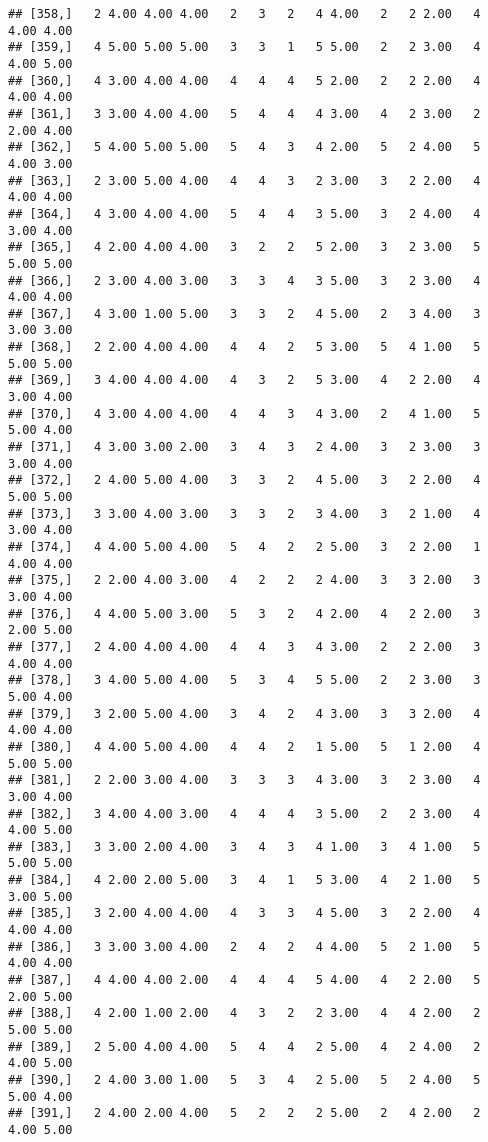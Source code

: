\documentclass[]{article}
\begin{document}
\begin{verbatim}
## [358,]   2 4.00 4.00 4.00   2   3   2   4 4.00   2   2 2.00   4 4.00 4.00
## [359,]   4 5.00 5.00 5.00   3   3   1   5 5.00   2   2 3.00   4 4.00 5.00
## [360,]   4 3.00 4.00 4.00   4   4   4   5 2.00   2   2 2.00   4 4.00 4.00
## [361,]   3 3.00 4.00 4.00   5   4   4   4 3.00   4   2 3.00   2 2.00 4.00
## [362,]   5 4.00 5.00 5.00   5   4   3   4 2.00   5   2 4.00   5 4.00 3.00
## [363,]   2 3.00 5.00 4.00   4   4   3   2 3.00   3   2 2.00   4 4.00 4.00
## [364,]   4 3.00 4.00 4.00   5   4   4   3 5.00   3   2 4.00   4 3.00 4.00
## [365,]   4 2.00 4.00 4.00   3   2   2   5 2.00   3   2 3.00   5 5.00 5.00
## [366,]   2 3.00 4.00 3.00   3   3   4   3 5.00   3   2 3.00   4 4.00 4.00
## [367,]   4 3.00 1.00 5.00   3   3   2   4 5.00   2   3 4.00   3 3.00 3.00
## [368,]   2 2.00 4.00 4.00   4   4   2   5 3.00   5   4 1.00   5 5.00 5.00
## [369,]   3 4.00 4.00 4.00   4   3   2   5 3.00   4   2 2.00   4 3.00 4.00
## [370,]   4 3.00 4.00 4.00   4   4   3   4 3.00   2   4 1.00   5 5.00 4.00
## [371,]   4 3.00 3.00 2.00   3   4   3   2 4.00   3   2 3.00   3 3.00 4.00
## [372,]   2 4.00 5.00 4.00   3   3   2   4 5.00   3   2 2.00   4 5.00 5.00
## [373,]   3 3.00 4.00 3.00   3   3   2   3 4.00   3   2 1.00   4 3.00 4.00
## [374,]   4 4.00 5.00 4.00   5   4   2   2 5.00   3   2 2.00   1 4.00 4.00
## [375,]   2 2.00 4.00 3.00   4   2   2   2 4.00   3   3 2.00   3 3.00 4.00
## [376,]   4 4.00 5.00 3.00   5   3   2   4 2.00   4   2 2.00   3 2.00 5.00
## [377,]   2 4.00 4.00 4.00   4   4   3   4 3.00   2   2 2.00   3 4.00 4.00
## [378,]   3 4.00 5.00 4.00   5   3   4   5 5.00   2   2 3.00   3 5.00 4.00
## [379,]   3 2.00 5.00 4.00   3   4   2   4 3.00   3   3 2.00   4 4.00 4.00
## [380,]   4 4.00 5.00 4.00   4   4   2   1 5.00   5   1 2.00   4 5.00 5.00
## [381,]   2 2.00 3.00 4.00   3   3   3   4 3.00   3   2 3.00   4 3.00 4.00
## [382,]   3 4.00 4.00 3.00   4   4   4   3 5.00   2   2 3.00   4 4.00 5.00
## [383,]   3 3.00 2.00 4.00   3   4   3   4 1.00   3   4 1.00   5 5.00 5.00
## [384,]   4 2.00 2.00 5.00   3   4   1   5 3.00   4   2 1.00   5 3.00 5.00
## [385,]   3 2.00 4.00 4.00   4   3   3   4 5.00   3   2 2.00   4 4.00 4.00
## [386,]   3 3.00 3.00 4.00   2   4   2   4 4.00   5   2 1.00   5 4.00 4.00
## [387,]   4 4.00 4.00 2.00   4   4   4   5 4.00   4   2 2.00   5 2.00 5.00
## [388,]   4 2.00 1.00 2.00   4   3   2   2 3.00   4   4 2.00   2 5.00 5.00
## [389,]   2 5.00 4.00 4.00   5   4   4   2 5.00   4   2 4.00   2 4.00 5.00
## [390,]   2 4.00 3.00 1.00   5   3   4   2 5.00   5   2 4.00   5 5.00 4.00
## [391,]   2 4.00 2.00 4.00   5   2   2   2 5.00   2   4 2.00   2 4.00 5.00

\end{verbatim}
\end{document}

